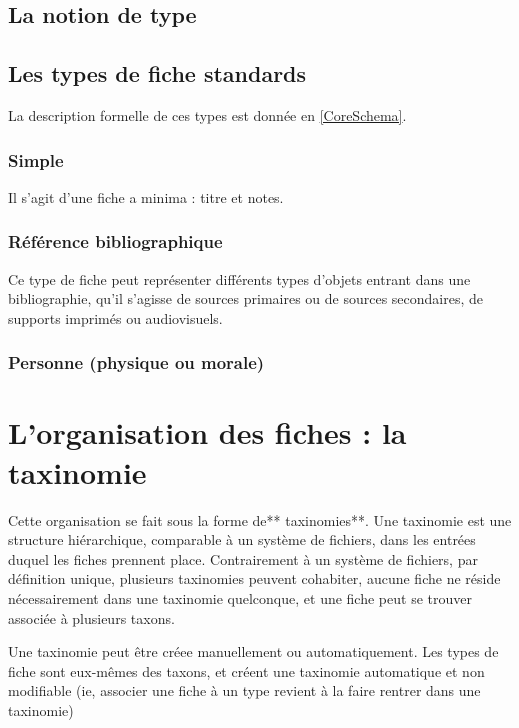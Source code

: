 \documentclass[11pt]{article}
\begin{document}
\subsection{La notion de type}\label{sub:Type}

\subsection{Les types de fiche standards}\label{sub:Types}

La description formelle de ces types est donnée en \vref{CoreSchema}.

\subsubsection{Simple}\label{simple}

Il s'agit d'une fiche a minima : titre et notes.

\subsubsection{Référence
bibliographique}\label{ruxe9fuxe9rence-bibliographique}

Ce type de fiche peut représenter différents types d'objets entrant dans
une bibliographie, qu'il s'agisse de sources primaires ou de sources
secondaires, de supports imprimés ou audiovisuels.

\subsubsection{Personne (physique ou
morale)}\label{personne-physique-ou-morale}

\section{L'organisation des fiches : la
taxinomie}\label{lorganisation-des-fiches-la-taxinomie}

Cette organisation se fait sous la forme de** taxinomies**. Une
taxinomie est une structure hiérarchique, comparable à un système de
fichiers, dans les entrées duquel les fiches prennent place.
Contrairement à un système de fichiers, par définition unique, plusieurs
taxinomies peuvent cohabiter, aucune fiche ne réside nécessairement dans
une taxinomie quelconque, et une fiche peut se trouver associée à
plusieurs taxons.

Une taxinomie peut être créee manuellement ou automatiquement. Les types
de fiche sont eux-mêmes des taxons, et créent une taxinomie automatique
et non modifiable (ie, associer une fiche à un type revient à la faire
rentrer dans une taxinomie)
\end{document}
